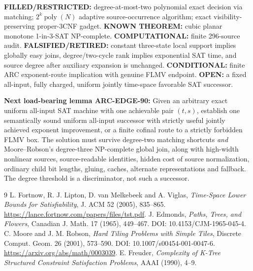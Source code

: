 \documentclass[11pt]{article}
\begin{document}
\noindent\textbf{FILLED/RESTRICTED:} degree-at-most-two polynomial exact decision via matching; \(2^k\operatorname{poly}(N)\) adaptive source-occurrence algorithm; exact visibility-preserving proper-3CNF gadget. \textbf{KNOWN THEOREM:} cubic planar monotone 1-in-3-SAT NP-complete. \textbf{COMPUTATIONAL:} finite 296-source audit. \textbf{FALSIFIED/RETIRED:} constant three-state local support implies globally easy joins, degree/two-cycle rank implies exponential SAT time, and source degree after auxiliary expansion is unchanged. \textbf{CONDITIONAL:} finite ARC exponent-route implication with genuine FLMV endpoint. \textbf{OPEN:} a fixed all-input, fully charged, uniform jointly time-space favorable SAT successor.

\noindent\textbf{Next load-bearing lemma ARC-EDGE-90:} Given an arbitrary exact uniform all-input SAT machine with one achievable pair \((t,s)\), establish one semantically sound uniform all-input successor with strictly useful jointly achieved exponent improvement, or a finite cofinal route to a strictly forbidden FLMV box. The solution must survive degree-two matching shortcuts \emph{and} Moore--Robson's degree-three NP-complete global join, along with high-width nonlinear sources, source-readable identities, hidden cost of source normalization, ordinary child bit lengths, gluing, caches, alternate representations and fallback. The degree threshold is a discriminator, not such a successor.

\begin{thebibliography}{9}
 L. Fortnow, R. J. Lipton, D. van Melkebeek and A. Viglas, \emph{Time-Space Lower Bounds for Satisfiability}, J. ACM 52 (2005), 835--865. \url{https://lance.fortnow.com/papers/files/tst.pdf}.
 J. Edmonds, \emph{Paths, Trees, and Flowers}, Canadian J. Math. 17 (1965), 449--467. DOI: 10.4153/CJM-1965-045-4.
 C. Moore and J. M. Robson, \emph{Hard Tiling Problems with Simple Tiles}, Discrete Comput. Geom. 26 (2001), 573--590. DOI: 10.1007/s00454-001-0047-6. \url{https://arxiv.org/abs/math/0003039}.
 E. Freuder, \emph{Complexity of K-Tree Structured Constraint Satisfaction Problems}, AAAI (1990), 4--9.
\end{thebibliography}
\end{document}
